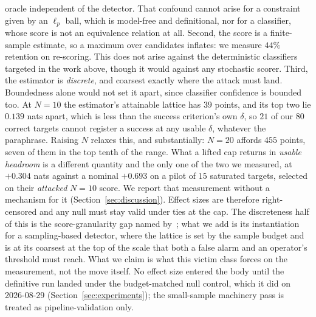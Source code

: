 oracle independent of the detector. That confound cannot arise for a constraint given by an
$\ell_p$ ball, which is model-free and definitional, nor for a classifier, whose score is
not an equivalence relation at all. Second, the score is a finite-sample estimate, so a
maximum over candidates inflates: we measure $44\%$ retention on re-scoring. This does not
arise against the deterministic classifiers targeted in the work above, though it would
against any stochastic scorer. Third, the estimator is \emph{discrete}, and coarsest exactly
where the attack must land. Boundedness alone would not set it apart, since classifier
confidence is bounded too. At $N{=}10$ the
estimator's attainable lattice has $39$ points, and its top two lie $0.139$ nats apart,
which is less than the success criterion's own $\delta$, so $21$ of our $80$ correct targets
cannot register a success at any usable $\delta$, whatever the paraphrase. Raising $N$
relaxes this, and substantially: $N{=}20$ affords $455$ points, seven of them in the top
tenth of the range. What a lifted cap returns in \emph{usable headroom} is a different
quantity and the only one of the two we measured, at $+0.304$ nats against a nominal
$+0.693$ on a pilot of $15$ saturated targets, selected on their \emph{attacked}
$N{=}10$ score. We report that measurement without a mechanism for it
(Section~\ref{sec:discussion}). Effect sizes are
therefore right-censored and any null must stay valid under ties at the cap. The discreteness
half of this is the score-granularity gap named by~\citet{sun2026granularity}; what we add
is its instantiation for a sampling-based detector, where the lattice is set by the sample
budget and is at its coarsest at the top of the scale that both a false alarm and an
operator's threshold must reach. What we claim is what this victim class forces on the measurement,
not the move itself. No effect size entered the body until the definitive
run landed under the budget-matched null control, which it did on 2026-08-29
(Section~\ref{sec:experiments}); the small-sample machinery pass is treated as
pipeline-validation only.
